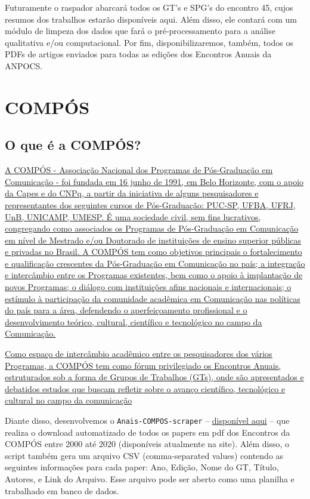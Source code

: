 \documentclass[
]{book}
\begin{document}
Futuramente o raspador abarcará todos os GT's e SPG's do encontro 45, cujos resumos dos trabalhos estarão disponíveis aqui. Além disso, ele contará com um módulo de limpeza dos dados que fará o pré-processamento para a análise qualitativa e/ou computacional. Por fim, disponibilizaremos, também, todos os PDFs de artigos enviados para todas as edições dos Encontros Anuais da ANPOCS.

\hypertarget{compuxf3s}{%
\chapter{COMPÓS}\label{compuxf3s}}

\hypertarget{o-que-uxe9-a-compuxf3s}{%
\section{O que é a COMPÓS?}\label{o-que-uxe9-a-compuxf3s}}

\href{https://www.compos.org.br/a_compos.php}{A COMPÓS - Associação Nacional dos Programas de Pós-Graduação em Comunicação - foi fundada em 16 junho de 1991, em Belo Horizonte, com o apoio da Capes e do CNPq, a partir da iniciativa de alguns pesquisadores e representantes dos seguintes cursos de Pós-Graduação: PUC-SP, UFBA, UFRJ, UnB, UNICAMP, UMESP. É uma sociedade civil, sem fins lucrativos, congregando como associados os Programas de Pós-Graduação em Comunicação em nível de Mestrado e/ou Doutorado de instituições de ensino superior públicas e privadas no Brasil. A COMPÓS tem como objetivos principais o fortalecimento e qualificação crescentes da Pós-Graduação em Comunicação no país; a integração e intercâmbio entre os Programas existentes, bem como o apoio à implantação de novos Programas; o diálogo com instituições afins nacionais e internacionais; o estímulo à participação da comunidade acadêmica em Comunicação nas políticas do país para a área, defendendo o aperfeiçoamento profissional e o desenvolvimento teórico, cultural, científico e tecnológico no campo da Comunicação.}

\href{https://www.compos.org.br/encontros_anuais.php}{Como espaço de intercâmbio acadêmico entre os pesquisadores dos vários Programas, a COMPÓS tem como fórum privilegiado os Encontros Anuais, estruturados sob a forma de Grupos de Trabalhos (GTs), onde são apresentados e debatidos estudos que buscam refletir sobre o avanço científico, tecnológico e cultural no campo da comunicação}

Diante disso, desenvolvemos o \texttt{Anais-COMPOS-scraper} -- \href{https://github.com/LABHDUFBA/Anais-COMPOS-scraper}{disponível aqui} -- que realiza o download automatizado de todos os papers em pdf dos Encontros da COMPÓS entre 2000 até 2020 (disponíveis atualmente na site). Além disso, o script também gera um arquivo CSV (comma-separated values) contendo as seguintes informações para cada paper: Ano, Edição, Nome do GT, Título, Autores, e Link do Arquivo. Esse arquivo pode ser aberto como uma planilha e trabalhado em banco de dados.
\end{document}
